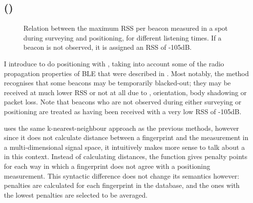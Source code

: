 \subsection{\BRP (\aBRP)}
\label{sec:architecture-brp}
\begin{figure}[p]
    \begin{subfigure}[b]{0.5\textwidth}
    \end{subfigure}
    \begin{subfigure}[b]{0.5\textwidth}
    \end{subfigure}
    \begin{subfigure}[b]{0.5\textwidth}
    \end{subfigure}
    \begin{subfigure}[b]{0.5\textwidth}
    \end{subfigure}
    \caption{Relation between the maximum RSS per beacon measured in a spot during surveying and positioning, for different listening times. If a beacon is not observed, it is assigned an RSS of -105dB.}
    \label{fig:architecture-rss-cloud}
\end{figure}


I introduce \BRP to do positioning with \BLE, taking into account some of the radio propagation properties of BLE that were described in . 
Most notably, the method recognises that some beacons may be temporarily blacked-out; they may be received at much lower RSS or not at all due to \mpi, orientation, body shadowing or packet loss.
Note that beacons who are not observed during either surveying or positioning are treated as having been received with a very low RSS of -105dB.

\aBRP uses the same k-nearest-neighbour approach as the previous methods, however since it does not calculate distance between a fingerprint and the measurement in a multi-dimensional signal space, it intuitively makes more sense to talk about a  in this context.
Instead of calculating distances, the function gives penalty points for each way in which a fingerprint does not agree with a positioning measurement.
This syntactic difference does not change its semantics however: penalties are calculated for each fingerprint in the database, and the ones with the lowest penalties are selected to be averaged.

